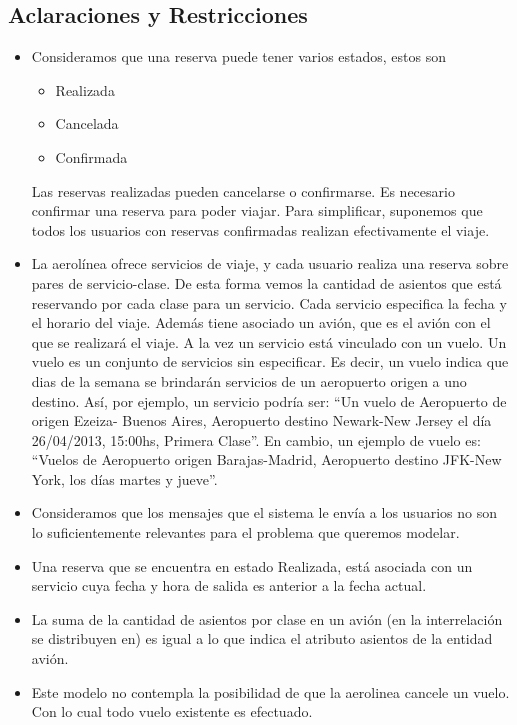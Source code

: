 \subsection{Aclaraciones y Restricciones}
  \begin{itemize}
    \item Consideramos que una reserva puede tener varios estados, estos son
          \begin{itemize}
            \item   Realizada
            \item   Cancelada
            \item   Confirmada
          \end{itemize}

          Las reservas realizadas pueden cancelarse o confirmarse.
          Es necesario confirmar una reserva para poder viajar.
          Para simplificar, suponemos que todos los usuarios con reservas
          confirmadas realizan efectivamente el viaje.
    
    \item La aerolínea ofrece servicios de viaje, y cada usuario realiza una
          reserva sobre pares de servicio-clase.
          De esta forma vemos la cantidad de asientos que está reservando por
          cada clase para un servicio.
          Cada servicio especifica la fecha y el horario del viaje. Además 
          tiene asociado un avión, que es el avión con el que se realizará
          el viaje.
          A la vez un servicio está vinculado con un vuelo. Un vuelo es
          un conjunto de servicios sin especificar. Es decir, un vuelo indica 
          que dias de la semana se brindarán servicios de un aeropuerto origen 
          a uno destino.
          Así, por ejemplo, un servicio podría ser:
          ``Un vuelo de Aeropuerto de origen Ezeiza- Buenos Aires, Aeropuerto 
          destino Newark-New Jersey el día 26/04/2013, 15:00hs, Primera Clase''.
          En cambio, un ejemplo de vuelo es:
         ``Vuelos de Aeropuerto origen Barajas-Madrid, Aeropuerto destino 
          JFK-New York, los días martes y jueve''.
	
    \item Consideramos que los mensajes que el sistema le envía a los usuarios
          no son lo suficientemente relevantes para el problema que queremos
          modelar.
          
    \item Una reserva que se encuentra en estado Realizada, está asociada con un
    	  servicio cuya fecha y hora de salida es anterior a la fecha actual.
    	  
	\item La suma de la cantidad de asientos por clase en un avión (en la 
		  interrelación se distribuyen en) es igual a lo que indica el 
		  atributo asientos de la entidad avión.
	
	\item Este modelo no contempla la posibilidad de que la aerolinea cancele un
		  vuelo. Con lo cual todo vuelo existente es efectuado.
            
  \end{itemize}
